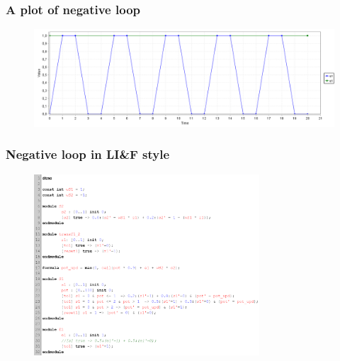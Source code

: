 \begin{frame}
  \frametitle{A plot of negative loop}

  \begin{figure}
    \includegraphics[width=\textwidth]{pic/neg_loop_simple_plot_1.png}
  \end{figure}

\end{frame}

\begin{frame}
  \frametitle{Negative loop in LI\&F style}

  \begin{figure}
    \includegraphics[width=0.75\textwidth]{pic/neg_loop_compl.png}
  \end{figure}

\end{frame}

